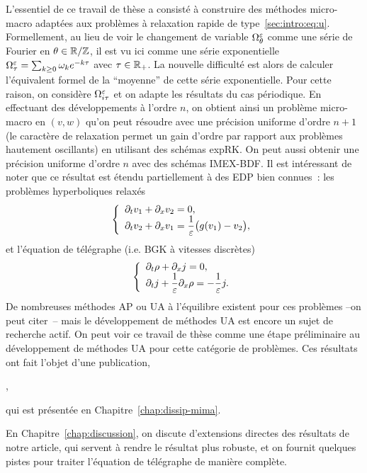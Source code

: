 L'essentiel de ce travail de thèse a consisté à construire des méthodes micro-macro adaptées aux problèmes à relaxation rapide de type~\eqref{sec:intro:eq:u}. Formellement, au lieu de voir le changement de variable $\Omega^\varepsilon_\theta$ comme une série de Fourier en $\theta \in \mathbb{R}/\mathbb{Z}$, il est vu ici comme une série exponentielle $\Omega^\varepsilon_\tau = \sum_{k \geq 0} \omega_k e^{-k\tau}$ avec $\tau \in \mathbb{R}_+$. La nouvelle difficulté est alors de calculer l'équivalent formel de la \enquote{moyenne} de cette série exponentielle. Pour cette raison, on considère $\Omega^\varepsilon_{i\tau}$ et on adapte les résultats du cas périodique. En effectuant des développements à l'ordre $n$, on obtient ainsi un problème micro-macro en $(v,w)$ qu'on peut résoudre avec une précision uniforme d'ordre $n+1$ (le caractère de relaxation permet un gain d'ordre par rapport aux problèmes hautement oscillants) en utilisant des schémas expRK. On peut aussi obtenir une précision uniforme d'ordre $n$ avec des schémas IMEX-BDF. Il est intéressant de noter que ce résultat est étendu partiellement à des EDP bien connues~: les problèmes hyperboliques relaxés
\begin{equation*}
    \left\{ \begin{array}{l} \displaystyle
    \partial_t v_1 + \partial_x v_2 = 0 , \\ \displaystyle
    \partial_t v_2 + \partial_x v_1 = \frac{1}{\varepsilon} \big( g(v_1) - v_2 \big) ,
    \end{array} \right .
\end{equation*}
et l'équation de télégraphe (i.e. BGK à vitesses discrètes)
\begin{equation*}
    \left\{ \begin{array}{l} \displaystyle
    \partial_t \rho + \partial_x j = 0, \\ \displaystyle
    \partial_t j + \frac{1}{\varepsilon}\partial_x \rho = -\frac{1}{\varepsilon} j .
\end{array} \right .
\end{equation*}
De nombreuses méthodes AP ou UA à l'équilibre existent pour ces problèmes --on peut citer~\cite{jin.1999.efficient,lemou.2008.new,dimarco.2011.exponential,dimarco.2017.implicit,boscarino.2017.unified,albi.2020.implicit}-- mais le développement de méthodes UA est encore un sujet de recherche actif. On peut voir ce travail de thèse comme une étape préliminaire au développement de méthodes UA pour cette catégorie de problèmes. Ces résultats ont fait l'objet d'une publication, 
\begin{center}\begin{minipage}{.75\textwidth}
    \noindent
    ,
\end{minipage}\end{center}
qui est présentée en Chapitre~\ref{chap:dissip-mima}. 

En Chapitre~\ref{chap:discussion}, on discute d'extensions directes des résultats de notre article, qui servent à rendre le résultat plus robuste, et on fournit quelques pistes pour traiter l'équation de télégraphe de manière complète. 